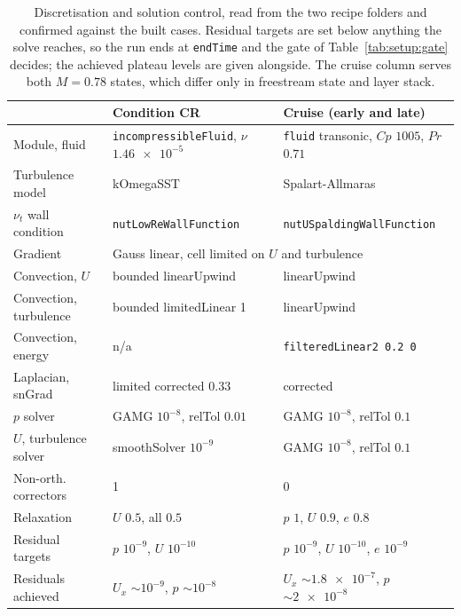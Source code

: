 \begin{table}[htbp]
  \centering
  \scriptsize
  \caption{Discretisation and solution control, read from the two recipe folders and confirmed
  against the built cases. Residual targets are set below anything the solve reaches, so the run
  ends at \texttt{endTime} and the gate of Table~\ref{tab:setup:gate} decides; the achieved
  plateau levels are given alongside. The cruise column serves both $M = 0.78$ states, which
  differ only in freestream state and layer stack.}
  \label{tab:setup:numerics}
  \begin{tabular}{lll}
    \toprule
     & Condition CR & Cruise (early and late) \\
    \midrule
    Module, fluid        & \texttt{incompressibleFluid}, $\nu$ $\num{1.46e-5}$
                         & \texttt{fluid} transonic, $Cp$ $1005$, $Pr$ $0.71$ \\
    Turbulence model     & kOmegaSST & Spalart-Allmaras \\
    $\nu_t$ wall condition & \texttt{nutLowReWallFunction} & \texttt{nutUSpaldingWallFunction} \\
    Gradient             & \multicolumn{2}{l}{Gauss linear, cell limited on $U$ and turbulence} \\
    Convection, $U$      & bounded linearUpwind & linearUpwind \\
    Convection, turbulence & bounded limitedLinear 1 & linearUpwind \\
    Convection, energy   & n/a & \texttt{filteredLinear2 0.2 0} \\
    Laplacian, snGrad    & limited corrected $0.33$ & corrected \\
    $p$ solver           & GAMG $10^{-8}$, relTol $0.01$ & GAMG $10^{-8}$, relTol $0.1$ \\
    $U$, turbulence solver & smoothSolver $10^{-9}$ & GAMG $10^{-8}$, relTol $0.1$ \\
    Non-orth. correctors & 1 & 0 \\
    Relaxation           & $U$ $0.5$, all $0.5$ & $p$ $1$, $U$ $0.9$, $e$ $0.8$ \\
    Residual targets     & $p$ $10^{-9}$, $U$ $10^{-10}$
                         & $p$ $10^{-9}$, $U$ $10^{-10}$, $e$ $10^{-9}$ \\
    Residuals achieved   & $U_x$ $\sim10^{-9}$, $p$ $\sim10^{-8}$
                         & $U_x$ $\sim\num{1.8e-7}$, $p$ $\sim\num{2e-8}$ \\
    \bottomrule
  \end{tabular}
\end{table}

